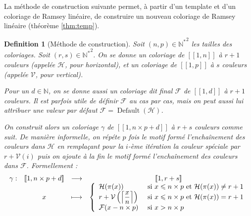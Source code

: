 \documentclass{article}
\newtheorem{definition}{Definition}[section]
\DeclareMathOperator{\findef}{Default}
\begin{document}
La méthode de construction suivante permet, à partir d'un template et d'un coloriage de Ramsey linéaire, de construire un nouveau coloriage de Ramsey linéaire (théorème \ref{thm:temp}).

\begin{definition}[Méthode de construction]
Soit \((n, p) \in {\mathbb{N}^*}^2\) les tailles des coloriages. Soit \((r, s) \in {\mathbb{N}^*}^2\). On se donne un coloriage de \([\![1, n]\!]\) à \(r + 1\) couleurs (appelée \(\mathcal{H}\), pour horizontal), et un coloriage de \([\![1, p]\!]\) à \(s\) couleurs (appelée \(\mathcal{V}\), pour vertical).

Pour un \(d \in \mathbb{N}\), on se donne aussi un coloriage dit final \(\mathcal{F}\) de \([\![1, d]\!]\) à \(r + 1\) couleurs. Il est parfois utile de définir \(\mathcal{F}\) au cas par cas, mais on peut aussi lui attribuer une valeur par défaut \(\mathcal{F} = \findef(\mathcal{H})\). 

On construit alors un coloriage \(\gamma\) de \([\![1, n \times p + d]\!]\) à \(r + s\) couleurs comme suit. De manière informelle, on répéte \(p\) fois le motif formé l'enchaînement des couleurs dans \(\mathcal{H}\) en remplaçant pour la \(i\)-ème itération la couleur spéciale par \(r + \mathcal{V}(i)\) puis on ajoute à la fin le motif formé l'enchaînement des couleurs dans \(\mathcal{F}\). Formellement :
\[\begin{array}{c c c c}
	\gamma: & [\![1, n \times p + d]\!]  & \longrightarrow &  [\![1, r + s]\!] \\
 	& x & \longmapsto & 
		\left\{\begin{array}{l l}
			\mathcal{H}(\pi(x)) & ~\text{si}~ x \leqslant n \times p ~\text{et}~ \mathcal{H}(\pi(x)) \neq r + 1 \\
			r + \mathcal{V}\left(\left\lceil \dfrac{x}{n} \right\rceil\right) & ~\text{si}~ x \leqslant n \times p ~\text{et}~ \mathcal{H}(\pi(x)) = r + 1 \\
			\mathcal{F}(x - n \times p) & ~\text{si}~ x > n \times p
		\end{array}\right.
\end{array}\]
\end{definition}
\end{document}
